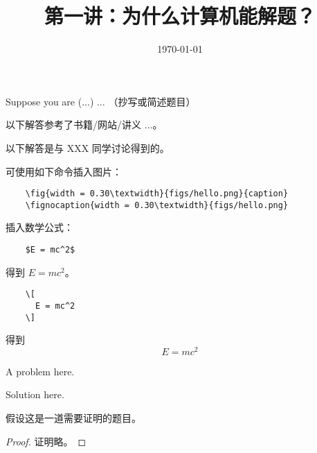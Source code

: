 \documentclass[11pt, a4paper, UTF8]{ctexart}
\title{第一讲：为什么计算机能解题？}
\date{\today}     %
\begin{document}
\maketitle
\noplagiarism	%
\beginthishw	%

\begin{problem}[UD: 1.5]	%
  Suppose you are ($\ldots$) $\ldots$ （抄写或简述题目）
\end{problem}

\begin{remark}	%
  以下解答参考了书籍/网站/讲义 $\ldots$。

  \noindent 以下解答是与 XXX 同学讨论得到的。
\end{remark}

\begin{solution}
  可使用如下命令插入图片：
  \begin{verbatim}
    \fig{width = 0.30\textwidth}{figs/hello.png}{caption}
    \fignocaption{width = 0.30\textwidth}{figs/hello.png}
  \end{verbatim}
  插入数学公式：
  \begin{verbatim}
    $E = mc^2$
  \end{verbatim}
  得到 $E = mc^2$。
  \begin{verbatim}
    \[
      E = mc^2
    \]
  \end{verbatim}
  得到
  \[
    E = mc^2
  \]
\end{solution}

\begin{problem}[UD: 1.3]
  A problem here.
\end{problem}

\begin{solution}
  Solution here.
\end{solution}
\begin{problem}[UD: x.x]
  假设这是一道需要证明的题目。	
\end{problem}


\begin{proof}
  证明略。	
\end{proof}
\begincorrection	%
\end{document}
